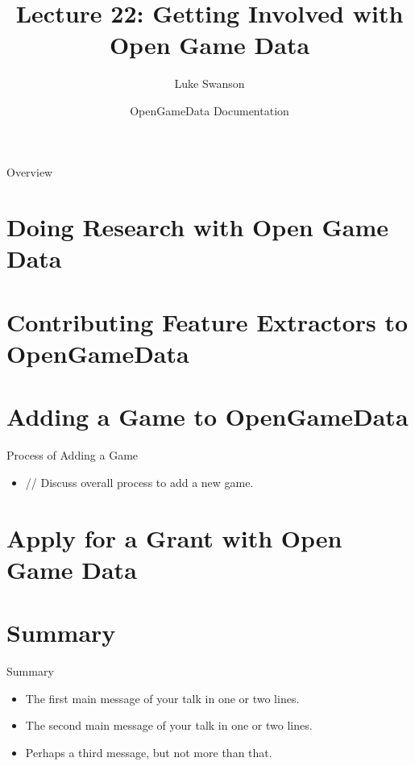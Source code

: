 \documentclass{beamer}
\title[Get Involved] %
{Lecture 22: Getting Involved with Open Game Data}
\author[Swanson] %
{Luke Swanson}
\institute[University of Wisconsin-Madison] %
{
  Field Day Lab\\
  University of Wisconsin-Madison
}
\date[OGD Docs] %
{OpenGameData Documentation}
\begin{document}
\begin{frame}
  \titlepage
\end{frame}

\begin{frame}{Overview}
  \tableofcontents
\end{frame}




\section[Research]{Doing Research with Open Game Data}

\section[Adding Features]{Contributing Feature Extractors to OpenGameData}

\section[Adding Games]{Adding a Game to OpenGameData}

\begin{frame}{Process of Adding a Game}
  \begin{itemize}
  \item
    // Discuss overall process to add a new game.
    \pause
  \end{itemize}
\end{frame}

\section[Applying for Grants]{Apply for a Grant with Open Game Data}

\section*{Summary}

\begin{frame}{Summary}
  \begin{itemize}
  \item
    The \alert{first main message} of your talk in one or two lines.
  \item
    The \alert{second main message} of your talk in one or two lines.
  \item
    Perhaps a \alert{third message}, but not more than that.
  \end{itemize}
\end{frame}
\end{document}
